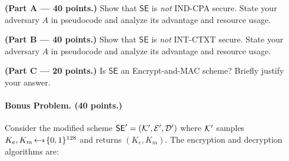 \documentclass[11pt]{article}
\newcommand{\schemefont}[1]{{\mathsf{#1}}}
\newcommand{\getsr}{{{\,\leftarrow{\hspace*{-3pt}\raisebox{.75pt}{$\scriptscriptstyle\$$}}\,}}}
\newcommand{\bits}{\{0,1\}}
\newcommand{\calK}{{\cal K}}
\newcommand{\calE}{{\cal E}}
\newcommand{\calD}{{\cal D}}
\begin{document}
\bigskip

\noindent
\textbf{(Part A --- 40 points.)}
Show that $\schemefont{SE}$ is \emph{not} IND-CPA secure.
State your adversary $A$ in pseudocode and analyze its advantage and resource usage.
\medskip

\noindent
\textbf{(Part B --- 40 points.)}
Show that $\schemefont{SE}$ is \emph{not} INT-CTXT secure.
State your adversary $A$ in pseudocode and analyze its advantage and resource usage. 

\medskip

\noindent
\textbf{(Part C --- 20 points.)} Is $\schemefont{SE}$ an Encrypt-and-MAC scheme? Briefly justify your answer.

\bigskip

\paragraph*{Bonus Problem. (40 points.)}
Consider the modified scheme $\schemefont{SE}' = (\calK', \calE', \calD')$ where
$\calK'$ samples $K_e, K_m \getsr \bits^{128}$ and returns $(K_e, K_m)$.
The encryption and decryption algorithms are:
\end{document}
